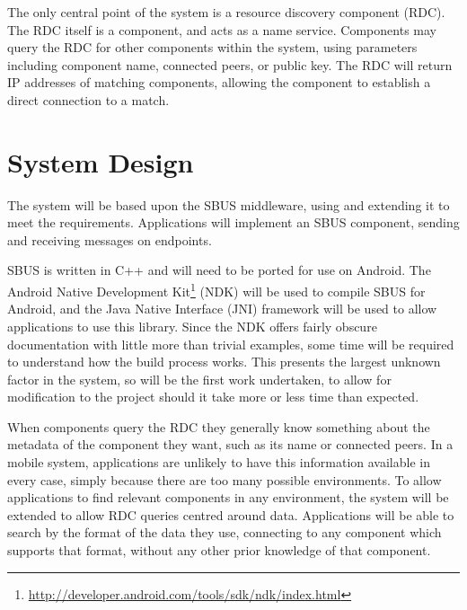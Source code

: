 \documentclass[12pt,twoside,notitlepage]{report}
\begin{document}
The only central point of the system is a resource discovery component (RDC). 
The RDC itself is a component, and acts as a name service. 
Components may query the RDC for other components within the system, using parameters including component name, connected peers, or public key. 
The RDC will return IP addresses of matching components, allowing the component to establish a direct connection to a match.

\section{System Design}

The system will be based upon the SBUS middleware, using and extending it to meet the requirements. 
Applications will implement an SBUS component, sending and receiving messages on endpoints. 

SBUS is written in C++ and will need to be ported for use on Android. 
The Android Native Development Kit\footnote{\url{http://developer.android.com/tools/sdk/ndk/index.html}} (NDK) will be used to compile SBUS for Android, and the Java Native Interface (JNI) framework will be used to allow applications to use this library. 
Since the NDK offers fairly obscure documentation with little more than trivial examples, some time will be required to understand how the build process works. 
This presents the largest unknown factor in the system, so will be the first work undertaken, to allow for modification to the project should it take more or less time than expected.

When components query the RDC they generally know something about the metadata of the component they want, such as its name or connected peers. 
In a mobile system, applications are unlikely to have this information available in every case, simply because there are too many possible environments. 
To allow applications to find relevant components in any environment, the system will be extended to allow RDC queries centred around data.
Applications will be able to search by the format of the data they use, connecting to any component which supports that format, without any other prior knowledge of that component.
\end{document}
